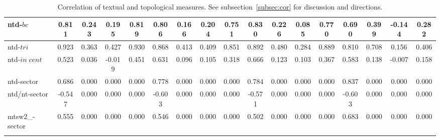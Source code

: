 \documentclass[%
 aip,
 jmp,%
 amsmath,amssymb,
 reprint,%
 floatfix,
]{revtex4-1}
\begin{document}
\begin{longtable*}{|p{2cm}|| c|c|c|c|| c|c|c|c|| c|c|c|c|| c|c|c|c|}
ntd-$bc$ & 0.811 & 0.243 & 0.195 & 0.819 & 0.806 & 0.166 & 0.204 & 0.751 & 0.830 & 0.226 & 0.085 & 0.770 & 0.690 & 0.399 & -0.144 & 0.282 \\ \hline
ntd-$tri$ & 0.923 & 0.363 & 0.427 & 0.930 & 0.868 & 0.413 & 0.409 & 0.851 & 0.892 & 0.480 & 0.284 & 0.889 & 0.810 & 0.708 & 0.156 & 0.406 \\ \hline
ntd-$in\;cent$ & 0.523 & 0.036 & -0.019 & 0.451 & 0.631 & 0.096 & 0.105 & 0.318 & 0.666 & 0.123 & 0.103 & 0.367 & 0.583 & 0.138 & -0.007 & 0.158 \\ \hline
ntd-sector & 0.686 & 0.000 & 0.000 & 0.000 & 0.778 & 0.000 & 0.000 & 0.000 & 0.784 & 0.000 & 0.000 & 0.000 & 0.837 & 0.000 & 0.000 & 0.000 \\ \hline
ntd/nt-sector & -0.547 & 0.000 & 0.000 & 0.000 & -0.603 & 0.000 & 0.000 & 0.000 & -0.571 & 0.000 & 0.000 & 0.000 & -0.603 & 0.000 & 0.000 & 0.000 \\ \hline
mtsw2\_-sector & 0.555 & 0.000 & 0.000 & 0.000 & 0.546 & 0.000 & 0.000 & 0.000 & 0.502 & 0.000 & 0.000 & 0.000 & 0.683 & 0.000 & 0.000 & 0.000 \\ \hline
  \caption{Correlation of textual and topological measures. See subsection~\ref{subsec:cor} for discussion and directions.}\label{tab:corTexTop}
\end{longtable*}
\end{document}

